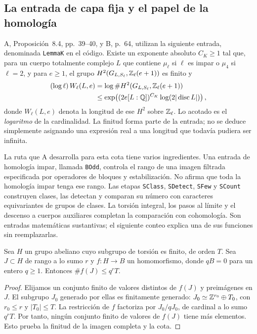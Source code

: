 \subsection{La entrada de capa fija y el papel de la homología}

A, Proposición~8.4, pp.~39--40, y B, p.~64, utilizan
la siguiente entrada, denominada \texttt{LemmaK} en el
código. Existe un exponente absoluto $C_K\ge1$ tal que,
para un cuerpo totalmente complejo $L$ que contiene
$\mu_\ell$ si $\ell$ es impar o $\mu_4$ si $\ell=2$,
y para $e\ge1$, el grupo
$H^2(G_{L,S_\ell},\mathbb{Z}_\ell(e+1))$ es finito y
\begin{equation}
 \begin{split}
 (\log\ell)\,W_\ell(L,e)
 &=
 \log\#H^2(G_{L,S_\ell},\mathbb{Z}_\ell(e+1))\\
 &\le
 \exp\!\left((2e[L:\mathbb{Q}])^{C_K}
                   \log(2|\operatorname{disc}L|)\right),
 \end{split}
 \label{eq:cohom-lema-k}
\end{equation}
donde $W_\ell(L,e)$ denota la longitud de ese $H^2$
sobre $\mathbb{Z}_\ell$.
Lo acotado es el \emph{logaritmo} de la cardinalidad.
La finitud forma parte de la entrada; no se deduce
simplemente asignando una expresión real a una longitud
que todavía pudiera ser infinita.

La ruta que A desarrolla para esta cota tiene varios
ingredientes. Una entrada de homología impar, llamada
\texttt{BOdd}, controla el rango de una imagen filtrada
especificada por operadores de bloques y estabilización.
No afirma que toda la homología impar tenga ese rango.
Las etapas \texttt{SClass}, \texttt{SDetect},
\texttt{SFew} y \texttt{SCount} construyen clases,
las detectan y comparan su número con caracteres
equivariantes de grupos de clases.
La torsión integral, los pasos al límite y el descenso
a cuerpos auxiliares completan la comparación con
cohomología.
Son entradas matemáticas sustantivas; el siguiente
conteo explica una de sus funciones sin reemplazarlas.

\begin{lema}
\label{lem:cohom-rango-torsion}
Sea $H$ un grupo abeliano cuyo subgrupo de torsión es
finito, de orden $T$. Sea $J\subset H$ de rango a lo
sumo $r$ y $f:H\to B$ un homomorfismo, donde $qB=0$
para un entero $q\ge1$. Entonces
$\#f(J)\le q^rT$.
\end{lema}

\begin{proof}
Elijamos un conjunto finito de valores distintos de
$f(J)$ y preimágenes en $J$. El subgrupo $J_0$ generado
por ellas es finitamente generado:
$J_0\simeq\mathbb{Z}^{r_0}\oplus T_0$, con $r_0\le r$ y
$|T_0|\le T$.
La restricción de $f$ factoriza por $J_0/qJ_0$, de
cardinal a lo sumo $q^rT$.
Por tanto, ningún conjunto finito de valores de $f(J)$
tiene más elementos. Esto prueba la finitud de la
imagen completa y la cota.
\end{proof}

